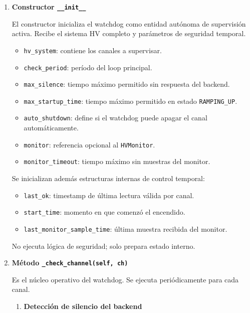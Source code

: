 \documentclass{article}
\begin{document}
\begin{enumerate}

\item \textbf{Constructor \texttt{\_\_init\_\_}}

El constructor inicializa el watchdog como entidad autónoma de supervisión activa. Recibe el sistema HV completo y parámetros de seguridad temporal.

\begin{itemize}
    \item \texttt{hv\_system}: contiene los canales a supervisar.
    \item \texttt{check\_period}: período del loop principal.
    \item \texttt{max\_silence}: tiempo máximo permitido sin respuesta del backend.
    \item \texttt{max\_startup\_time}: tiempo máximo permitido en estado \texttt{RAMPING\_UP}.
    \item \texttt{auto\_shutdown}: define si el watchdog puede apagar el canal automáticamente.
    \item \texttt{monitor}: referencia opcional al \texttt{HVMonitor}.
    \item \texttt{monitor\_timeout}: tiempo máximo sin muestras del monitor.
\end{itemize}

Se inicializan además estructuras internas de control temporal:

\begin{itemize}
    \item \texttt{last\_ok}: timestamp de última lectura válida por canal.
    \item \texttt{start\_time}: momento en que comenzó el encendido.
    \item \texttt{last\_monitor\_sample\_time}: última muestra recibida del monitor.
\end{itemize}

No ejecuta lógica de seguridad; solo prepara estado interno.

\vspace{0.3cm}

\item \textbf{Método \texttt{\_check\_channel(self, ch)}}

Es el núcleo operativo del watchdog. Se ejecuta periódicamente para cada canal.

\begin{enumerate}

\item \textbf{Detección de silencio del backend}


\end{enumerate}
\end{enumerate}
\end{document}
